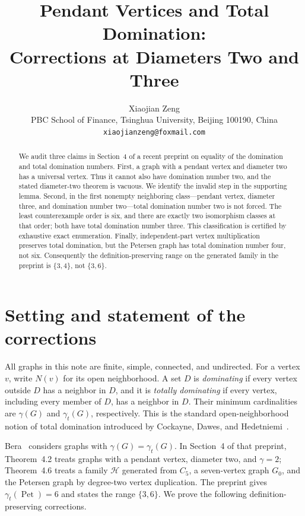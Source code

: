 \documentclass[11pt]{article}
\title{Pendant Vertices and Total Domination:\\
Corrections at Diameters Two and Three}
\author{Xiaojian Zeng\\
\small PBC School of Finance, Tsinghua University, Beijing 100190, China\\
\small \texttt{xiaojianzeng@foxmail.com}}
\date{}
\theoremstyle{remark}
\newcommand{\Petersen}{\operatorname{Pet}}
\begin{document}
\maketitle

\begin{abstract}
We audit three claims in Section~4 of a recent preprint on equality of the
domination and total domination numbers.  First, a graph with a pendant vertex
and diameter two has a universal vertex.  Thus it cannot also have domination
number two, and the stated diameter-two theorem is vacuous.  We identify the
invalid step in the supporting lemma.  Second, in the first nonempty neighboring
class---pendant vertex, diameter three, and domination number two---total
domination number two is not forced.  The least counterexample order is six,
and there are exactly two isomorphism classes at that order; both have total
domination number three.  This classification is certified by exhaustive exact
enumeration.  Finally, independent-part vertex multiplication preserves total
domination, but the Petersen graph has total domination number four, not six.
Consequently the definition-preserving range on the generated family in the
preprint is \(\{3,4\}\), not \(\{3,6\}\).
\end{abstract}

\section{Setting and statement of the corrections}

All graphs in this note are finite, simple, connected, and undirected.  For a
vertex \(v\), write \(N(v)\) for its open neighborhood.  A set \(D\) is
\emph{dominating} if every vertex outside \(D\) has a neighbor in \(D\), and it
is \emph{totally dominating} if every vertex, including every member of \(D\),
has a neighbor in \(D\).  Their minimum cardinalities are \(\gamma(G)\) and
\(\gamma_t(G)\), respectively.  This is the standard open-neighborhood notion
of total domination introduced by Cockayne, Dawes, and
Hedetniemi~\cite{CockayneDawesHedetniemi1980}.

Bera~\cite{Bera2026} considers graphs with \(\gamma(G)=\gamma_t(G)\).  In
Section~4 of that preprint, Theorem~4.2 treats graphs with a pendant vertex,
diameter two, and \(\gamma=2\); Theorem~4.6 treats a family \(\mathcal H\)
generated from \(C_5\), a seven-vertex graph \(G_0\), and the Petersen graph by
degree-two vertex duplication.  The preprint gives \(\gamma_t(\Petersen)=6\)
and states the range \(\{3,6\}\).  We prove the following definition-preserving
corrections.
\end{document}
